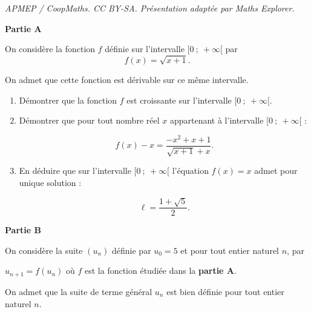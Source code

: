 \documentclass[10pt]{article}
\begin{document}
\noindent\textit{APMEP / CoopMaths. CC BY-SA. Présentation adaptée par Maths Explorer.}\par\medskip
\medskip

\textbf{Partie A}

\medskip

On considère la fonction $f$ définie sur l'intervalle $[0~;~+\infty[$ par 
\[f(x) = \sqrt{x + 1}.\]

On admet que cette fonction est dérivable sur ce même intervalle.

\medskip

\begin{enumerate}
\item Démontrer que la fonction $f$ est croissante sur l'intervalle $[0~;~+\infty[$.
\item Démontrer que pour tout nombre réel $x$ appartenant à l'intervalle $[0~;~+\infty[$ :

\[f(x) - x = \dfrac{-x^2 + x + 1}{\sqrt{x + 1} + x}.\]

\item En déduire que sur l'intervalle $[0~;~+\infty[$ l'équation $f(x) = x$ admet pour unique solution :

\[\ell = \dfrac{1 +\sqrt 5}{2}.\]

\end{enumerate}

\medskip

\textbf{Partie B}

\medskip

On considère la suite $\left(u_n\right)$ définie par $u_0 = 5$ et pour tout entier naturel $n$, par 

$u_{n+1} = f\left(u_n\right)$ où $f$ est la fonction étudiée dans la \textbf{partie A}.

On admet que la suite de terme général $u_n$ est bien définie pour tout entier naturel $n$.

\medskip
\end{document}
